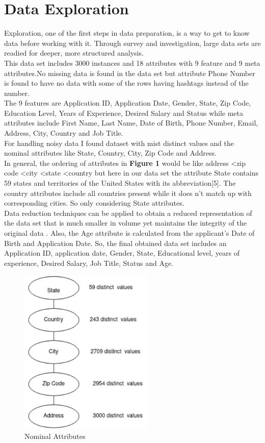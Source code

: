 \documentclass[lettersize,journal]{IEEEtran}
\begin{document}
\section{Data Exploration}
Exploration, one of the first steps in data preparation, is a way to get to know data before working with it. Through survey and investigation, large data sets are readied for deeper, more structured analysis.\\
\hspace{5mm} This data set includes 3000 instances and 18 attributes with 9 feature and 9 meta attributes.No missing data is found in the data set but attribute Phone Number is found to have no data with some of the rows having hashtags instead of the number.\\
The 9 features are Application ID,
Application Date, Gender, State, Zip Code, Education Level, Years of Experience, Desired Salary and Status while meta attributes include First Name, Last Name, Date of Birth, Phone Number, Email, Address, City, Country and Job Title.\\ For handling noisy data I found dataset  with mist distinct values and the nominal attributes like State, Country, City, Zip Code and
Address.\\

In general, the ordering of attributes in \textbf{Figure 1} would be like address \textless zip code \textless city \textless state \textless country but here in our data set the attribute State contains 59 states and territories of the United States with its abbreviation[5]. The country attributes include all countries present while it does n’t match up with corresponding cities. So only considering State attributes. \\
Data reduction techniques can be applied to obtain a reduced representation of the data set that is much smaller in volume yet maintains the integrity of the original data . Also, the Age attribute is calculated from the applicant's Date of Birth and Application Date. So, the final obtained data set includes an Application ID, application date, Gender, State, Educational level, years of experience, Desired Salary, Job Title, Status and Age.


\begin{figure}[t]
\centering
\includegraphics[width=2.5in]{Screenshot 2023-09-08 142035.png}
\caption{Nominal Attributes}
\label{fig_1}
\end{figure}
\end{document}
